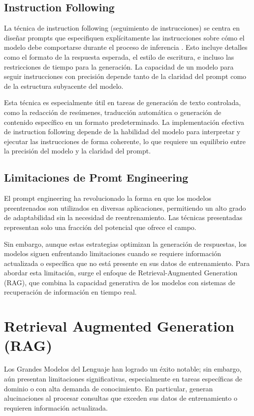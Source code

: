 \subsection{Instruction Following}

La técnica de instruction following (seguimiento de instrucciones) se centra en diseñar prompts que especifiquen explícitamente las instrucciones sobre cómo el modelo debe comportarse durante el proceso de inferencia \cite{lou2024largelanguagemodelinstruction}. 
Esto incluye detalles como el formato de la respuesta esperada, el estilo de escritura, e incluso las restricciones de tiempo para la generación. 
La capacidad de un modelo para seguir instrucciones con precisión depende tanto de la claridad del prompt como de la estructura subyacente del modelo.

Esta técnica es especialmente útil en tareas de generación de texto controlada, como la redacción de resúmenes, traducción automática o generación de contenido específico en un formato predeterminado. 
La implementación efectiva de instruction following depende de la habilidad del modelo para interpretar y ejecutar las instrucciones de forma coherente, lo que requiere un equilibrio entre la precisión del modelo y la claridad del prompt.

\subsection{Limitaciones de Promt Engineering}
El prompt engineering ha revolucionado la forma en que los modelos preentrenados son utilizados en diversas aplicaciones, permitiendo un alto grado de adaptabilidad sin la necesidad de reentrenamiento. 
Las técnicas presentadas representan solo una fracción del potencial que ofrece el campo. 

Sin embargo, aunque estas estrategias optimizan la generación de respuestas, los modelos siguen enfrentando limitaciones cuando se requiere información actualizada o específica que no está presente en sus datos de entrenamiento.
Para abordar esta limitación, surge el enfoque de Retrieval-Augmented Generation (RAG), que combina la capacidad generativa de los modelos con sistemas de recuperación de información en tiempo real.


\section{Retrieval Augmented Generation (RAG)}

Los Grandes Modelos del Lenguaje han logrado un éxito notable; sin embargo, aún presentan limitaciones significativas, especialmente en tareas específicas de dominio o con alta demanda de conocimiento. 
En particular, generan alucinaciones al procesar consultas que exceden sus datos de entrenamiento o requieren información actualizada.

